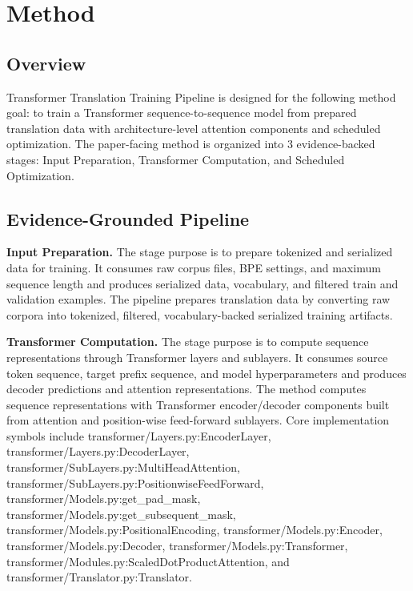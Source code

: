 \section{Method}

\subsection{Overview}
Transformer Translation Training Pipeline is designed for the following method goal: to train a Transformer sequence-to-sequence model from prepared translation data with architecture-level attention components and scheduled optimization. The paper-facing method is organized into 3 evidence-backed stages: Input Preparation, Transformer Computation, and Scheduled Optimization.

\subsection{Evidence-Grounded Pipeline}
\textbf{Input Preparation.} The stage purpose is to prepare tokenized and serialized data for training. It consumes raw corpus files, BPE settings, and maximum sequence length and produces serialized data, vocabulary, and filtered train and validation examples. The pipeline prepares translation data by converting raw corpora into tokenized, filtered, vocabulary-backed serialized training artifacts.

\textbf{Transformer Computation.} The stage purpose is to compute sequence representations through Transformer layers and sublayers. It consumes source token sequence, target prefix sequence, and model hyperparameters and produces decoder predictions and attention representations. The method computes sequence representations with Transformer encoder/decoder components built from attention and position-wise feed-forward sublayers. Core implementation symbols include transformer/Layers.py:EncoderLayer, transformer/Layers.py:DecoderLayer, transformer/SubLayers.py:MultiHeadAttention, transformer/SubLayers.py:PositionwiseFeedForward, transformer/Models.py:get\_pad\_mask, transformer/Models.py:get\_subsequent\_mask, transformer/Models.py:PositionalEncoding, transformer/Models.py:Encoder, transformer/Models.py:Decoder, transformer/Models.py:Transformer, transformer/Modules.py:ScaledDotProductAttention, and transformer/Translator.py:Translator.

